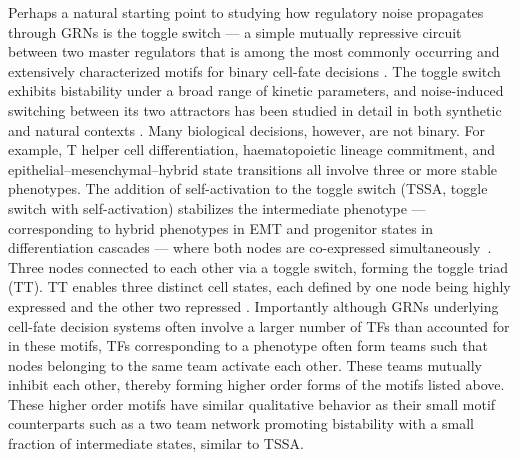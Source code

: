 \documentclass[11pt]{article}
\begin{document}
Perhaps a natural starting point to studying how regulatory noise propagates through GRNs is the toggle switch — a simple mutually repressive circuit between two master regulators that is among the most commonly occurring and extensively characterized motifs for binary cell-fate decisions \cite{gardner2000construction}. The toggle switch exhibits bistability under a broad range of kinetic parameters, and noise-induced switching between its two attractors has been studied in detail in both synthetic and natural contexts \cite{tian2006stochastic}. Many biological decisions, however, are not binary. For example, T helper cell differentiation, haematopoietic lineage commitment, and epithelial–mesenchymal–hybrid state transitions all involve three or more stable phenotypes. The addition of self-activation to the toggle switch (TSSA, toggle switch with self-activation) stabilizes the intermediate phenotype --- corresponding to hybrid phenotypes in EMT and progenitor states in differentiation cascades --- where both nodes are co-expressed simultaneously~\cite{Lu2013}. Three nodes connected to each other via a toggle switch, forming the toggle triad (TT). TT enables three distinct cell states, each defined by one node being highly expressed and the other two repressed \cite{doi:10.1098/rsif.2020.0631}. Importantly although GRNs underlying cell-fate decision systems often involve a larger number of TFs than accounted for in these motifs, TFs corresponding to a phenotype often form teams such that nodes belonging to the same team activate each other. These teams mutually inhibit each other, thereby forming higher order forms of the motifs listed above. These higher order motifs have similar qualitative behavior as their small motif counterparts such as a two team network promoting bistability with a small fraction of intermediate states, similar to TSSA. 
\end{document}
